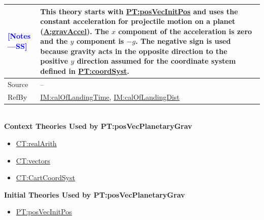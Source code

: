 \documentclass[12pt]{article}
\newcommand{\authornote}[3]{\textcolor{#1}{[#3 ---#2]}}
\newcommand{\authornote}[3]{}
\newcommand{\wss}[1]{\authornote{blue}{SS}{#1}}
\begin{document}
\begin{minipage}{\textwidth}
\begin{tabular}{>{\raggedright}p{}>{\raggedright\arraybackslash}p{}}
\\ \midrule \wss{Notes} & This theory starts with
\hyperref[PT:posVecInitPos]{PT:posVecInitPos} and uses the constant acceleration
for projectile motion on a planet (\hyperref[gravAccel]{A:gravAccel}).  The
$x$ component of the acceleration is zero and the $y$ component is $-g$.  The
negative sign is used because gravity acts in the opposite direction to the
positive $y$ direction assumed for the coordinate system defined in
\hyperref[PT:coordSyst]{PT:coordSyst}.

\\ \midrule
Source & --
         
\\ \midrule
RefBy & \hyperref[IM:calOfLandingTime]{IM:calOfLandingTime},
\hyperref[IM:calOfLandingDist]{IM:calOfLandingDist}

\\ \bottomrule
\end{tabular}
\end{minipage}
~\\

\noindent \textbf{Context Theories Used by PT:posVecPlanetaryGrav}

\begin{itemize}
\item \hyperref[CT:realArith]{CT:realArith}
\item \hyperref[CT:vectors]{CT:vectors}
\item \hyperref[CT:CartCoordSyst]{CT:CartCoordSyst}
\end{itemize}

\noindent \textbf{Initial Theories Used by PT:posVecPlanetaryGrav}

\begin{itemize}
\item \hyperref[PT:posVecInitPos]{PT:posVecInitPos}
\end{itemize}
\end{document}
